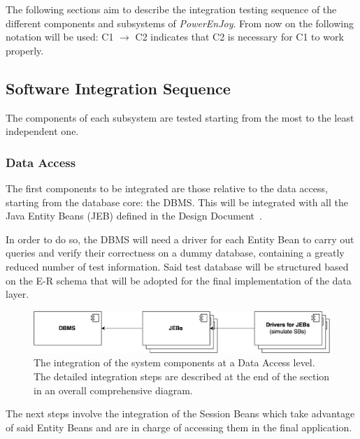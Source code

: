 The following sections aim to describe the integration testing sequence of the different components and subsystems of \emph{PowerEnJoy}. From now on the following notation will be used: C1 $\rightarrow$ C2 indicates that C2 is necessary for C1 to work properly.

\subsection{Software Integration Sequence}\label{soft_int_seq}
The components of each subsystem are tested starting from the most to the least independent one.

\subsubsection{Data Access}
The first components to be integrated are those relative to the data access, starting from the database core: the DBMS. This will be integrated with all the Java Entity Beans (JEB) defined in the Design Document~\cite{dd}. 

In order to do so, the DBMS will need a driver for each Entity Bean to carry out queries and verify their correctness on a dummy database, containing a greatly reduced number of test information. Said test database will be structured based on the E-R schema that will be adopted for the final implementation of the data layer.

\begin{figure}[H]
\begin{center}
		\includegraphics[width=\textwidth]{./integration_strategy/diagrams/data_access.png}
		\caption{The integration of the system components at a Data Access level. The detailed integration steps are described at the end of the section in an overall comprehensive diagram.}
\end{center}
\end{figure}

\noindent
The next steps involve the integration of the Session Beans which take advantage of said Entity Beans and are in charge of accessing them in the final application.

